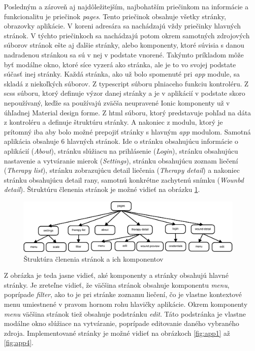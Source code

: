 Posledným a zároveň aj najdôležitejším, najbohatším priečinkom na informácie a funkcionalitu je priečinok \textit{pages}. Tento priečinok obsahuje všetky stránky, obrazovky aplikácie. V koreni adresára sa nachádzajú vždy priečinky hlavných stránok. V týchto priečinkoch sa nachádzajú potom okrem samotných zdrojových súborov stránok ešte aj ďalšie stránky, alebo komponenty, ktoré súvisia s danou nadradenou stránkou sa sú v nej v podstate vnorené. Takýmto príkladom môže byť modálne okno, ktoré síce vyzerá ako stránka, ale je to vo svojej podstate súčasť inej stránky. Každá stránka, ako už bolo spomenuté pri \textit{app} module, sa skladá z niekoľkých súborov. Z typescript súboru plniaceho funkciu kontroléru. Z scss súboru, ktorý definuje výzor danej stránky a je v aplikácií v podstate skoro nepoužívaný, keďže sa používajú zväčša neupravené Ionic komponenty už v úhľadnej Material design forme. Z html súboru, ktorý predstavuje pohľad na dáta z kontroléru a definuje štruktúru stránky. A nakoniec z modulu, ktorý je prítomný iba aby bolo možné prepojiť stránky s hlavným \textit{app} modulom. Samotná aplikácia obsahuje 6 hlavných stránok. Ide o stránku obsahujúcu informácie o aplikácií (\textit{About}), stránku slúžiacu na prihlásenie (\textit{Login}), stránku obsahujúcu nastavenie a vytváranie mierok (\textit{Settings}), stránku obsahujúcu zoznam liečení (\textit{Therapy list}), stránku zobrazujúcu detail liečenia (\textit{Therapy detail}) a nakoniec stránku obsahujúcu detail rany, samotnú konkrétne zachytenú snímku (\textit{Wounbd detail}). Štruktúru členenia stránok je možné vidieť na obrázku \ref{fig:pages}.
\begin{figure}[h]
  \centering
  \includegraphics[scale=0.364]{fig/pages.eps}
  \caption{Štruktúra členenia stránok a ich komponentov}
  \label{fig:pages}
\end{figure}
Z obrázka je teda jasne vidieť, aké komponenty a stránky obsahujú hlavné stránky. Je zreteľne vidieť, že väčšina stránok obsahuje komponentu \textit{menu}, poprípade \textit{filter}, ako to je pri stránke zoznamu liečení, čo je vlastne kontextové menu umiestnené v pravom hornom rohu hlavičky aplikácie. Okrem komponenty \textit{menu} väčšina stránok tiež obsahuje podstránku \textit{edit}. Táto podstránka je vlastne modálne okno slúžiace na vytváranie, poprípade editovanie daného vybraného zdroja. Implementované stránky je možné vidieť na obrázkoch \ref{fig:app1} až \ref{fig:app4}.
